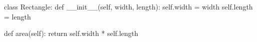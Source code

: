 \documentclass[multi, border=10]{standalone}
\begin{document}
\begin{fixedheightcode}
class Rectangle:
    def __init__(self, width, length):
        self.width = width
        self.length = length

    def area(self):
        return self.width * self.length
\end{fixedheightcode}
\end{document}
